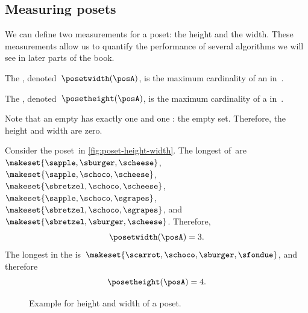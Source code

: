 \subsection{Measuring posets}


We can define two measurements for a poset: the height and the width.
These measurements allow us to quantify the performance of several algorithms we will see in later parts of the book.
\begin{definition}
    \label{def:poset-width}
    The , denoted~$\posetwidth(\posA)$, is the maximum cardinality of an  in~\posA.
\end{definition}

\begin{definition}
    \label{def:poset-height}
    The , denoted~$\posetheight(\posA)$, is the maximum cardinality of a  in~\posA.
\end{definition}

Note that an empty  has exactly one  and one : the empty set.
Therefore, the height and width are zero.

\begin{example}
    Consider the poset~\posA in \cref{fig:poset-height-width}.
    The longest  of~\posA are~$\makeset{\sapple, \sburger, \scheese}$, $\makeset{\sapple, \schoco, \scheese}$, $\makeset{\sbretzel, \schoco, \scheese}$, $\makeset{\sapple, \schoco, \sgrapes}$, $\makeset{\sbretzel, \schoco, \sgrapes}$, and~$\makeset{\sbretzel, \sburger, \scheese}$.
    Therefore,
    \begin{equation}\label{eq:poset-height-width-1}
        \posetwidth(\posA)=3.
    \end{equation}
    The longest  in the  is~$\makeset{\scarrot,\schoco,\sburger,\sfondue}$, and therefore
    \begin{equation}\label{eq:poset-height-width-2}
        \posetheight(\posA)=4.
    \end{equation}
\end{example}

\begin{figure}[h]
    \caption{Example for height and width of a poset.
    }
\end{figure}

